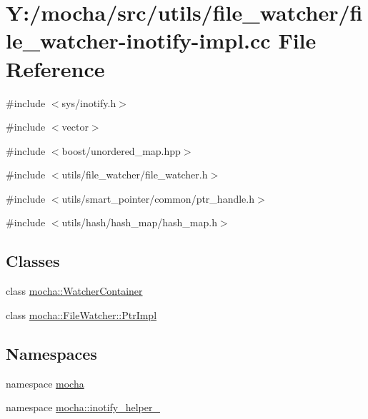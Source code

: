 \hypertarget{file__watcher-inotify-impl_8cc}{
\section{Y:/mocha/src/utils/file\_\-watcher/file\_\-watcher-\/inotify-\/impl.cc File Reference}
\label{file__watcher-inotify-impl_8cc}
}
{\ttfamily \#include $<$sys/inotify.h$>$}\par
{\ttfamily \#include $<$vector$>$}\par
{\ttfamily \#include $<$boost/unordered\_\-map.hpp$>$}\par
{\ttfamily \#include $<$utils/file\_\-watcher/file\_\-watcher.h$>$}\par
{\ttfamily \#include $<$utils/smart\_\-pointer/common/ptr\_\-handle.h$>$}\par
{\ttfamily \#include $<$utils/hash/hash\_\-map/hash\_\-map.h$>$}\par
\subsection*{Classes}
\begin{DoxyCompactItemize}
\item 
class \hyperlink{classmocha_1_1_watcher_container}{mocha::WatcherContainer}
\item 
class \hyperlink{classmocha_1_1_file_watcher_1_1_ptr_impl}{mocha::FileWatcher::PtrImpl}
\end{DoxyCompactItemize}
\subsection*{Namespaces}
\begin{DoxyCompactItemize}
\item 
namespace \hyperlink{namespacemocha}{mocha}
\item 
namespace \hyperlink{namespacemocha_1_1inotify__helper__}{mocha::inotify\_\-helper\_\-}
\end{DoxyCompactItemize}
